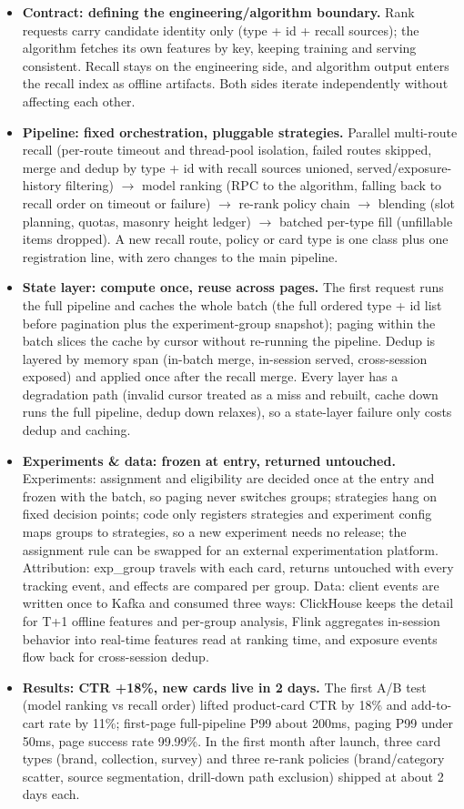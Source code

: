 \documentclass{resume}
\begin{document}
\begin{itemize}
    \item \textbf{Contract: defining the engineering/algorithm boundary.} Rank requests carry candidate identity only (type + id + recall sources); the algorithm fetches its own features by key, keeping training and serving consistent. Recall stays on the engineering side, and algorithm output enters the recall index as offline artifacts. Both sides iterate independently without affecting each other.
    \item \textbf{Pipeline: fixed orchestration, pluggable strategies.} Parallel multi-route recall (per-route timeout and thread-pool isolation, failed routes skipped, merge and dedup by type + id with recall sources unioned, served/exposure-history filtering) $\rightarrow$ model ranking (RPC to the algorithm, falling back to recall order on timeout or failure) $\rightarrow$ re-rank policy chain $\rightarrow$ blending (slot planning, quotas, masonry height ledger) $\rightarrow$ batched per-type fill (unfillable items dropped). A new recall route, policy or card type is one class plus one registration line, with zero changes to the main pipeline.
    \item \textbf{State layer: compute once, reuse across pages.} The first request runs the full pipeline and caches the whole batch (the full ordered type + id list before pagination plus the experiment-group snapshot); paging within the batch slices the cache by cursor without re-running the pipeline. Dedup is layered by memory span (in-batch merge, in-session served, cross-session exposed) and applied once after the recall merge. Every layer has a degradation path (invalid cursor treated as a miss and rebuilt, cache down runs the full pipeline, dedup down relaxes), so a state-layer failure only costs dedup and caching.
    \item \textbf{Experiments \& data: frozen at entry, returned untouched.} Experiments: assignment and eligibility are decided once at the entry and frozen with the batch, so paging never switches groups; strategies hang on fixed decision points; code only registers strategies and experiment config maps groups to strategies, so a new experiment needs no release; the assignment rule can be swapped for an external experimentation platform. Attribution: exp\_group travels with each card, returns untouched with every tracking event, and effects are compared per group. Data: client events are written once to Kafka and consumed three ways: ClickHouse keeps the detail for T+1 offline features and per-group analysis, Flink aggregates in-session behavior into real-time features read at ranking time, and exposure events flow back for cross-session dedup.
    \item \textbf{Results: CTR +18\%, new cards live in 2 days.} The first A/B test (model ranking vs recall order) lifted product-card CTR by 18\% and add-to-cart rate by 11\%; first-page full-pipeline P99 about 200ms, paging P99 under 50ms, page success rate 99.99\%. In the first month after launch, three card types (brand, collection, survey) and three re-rank policies (brand/category scatter, source segmentation, drill-down path exclusion) shipped at about 2 days each.
\end{itemize}
\end{document}
